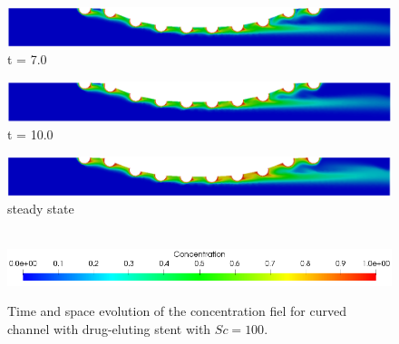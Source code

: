 \begin{figure}[H]
     \begin{minipage}{.50\linewidth}
      \centering
      \includegraphics[scale=0.18]{./02_chaps/cap_solution/figure/conc100_CurvedStrut6.png}\\
      t = 7.0
     \end{minipage}
     \begin{minipage}{.50\linewidth}
     \medskip
      \centering
      \includegraphics[scale=0.18]{./02_chaps/cap_solution/figure/conc100_CurvedStrut7.png}\\
      t = 10.0
     \end{minipage}%
     \begin{minipage}{.50\linewidth}
     \medskip
      \centering
      \includegraphics[scale=0.18]{./02_chaps/cap_solution/figure/conc100_CurvedStrut8.png}\\
      steady state
     \end{minipage}\\[10pt]
      \centering
      \includegraphics[scale=0.5]{./02_chaps/cap_solution/figure/conc1_CurvedStrutScale.png}\\
     \medskip
    \caption{
Time and space evolution of the concentration fiel for curved channel with drug-eluting stent with $Sc=100$.}
     \label{conc field curved stent sc 100}
\end{figure}

